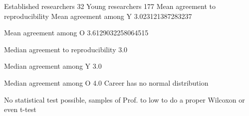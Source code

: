 Established researchers 32
Young researchers 177
Mean agreement to reproducibility
Mean agreement among Y 3.023121387283237

Mean agreement among O 3.6129032258064515

Median agreement to reproducibility 3.0

Median agreement among Y 3.0

Median agreement among O 4.0
Career has no normal distribution

No statistical test possible, samples of Prof. to low to do a proper Wilcoxon or even t-test

